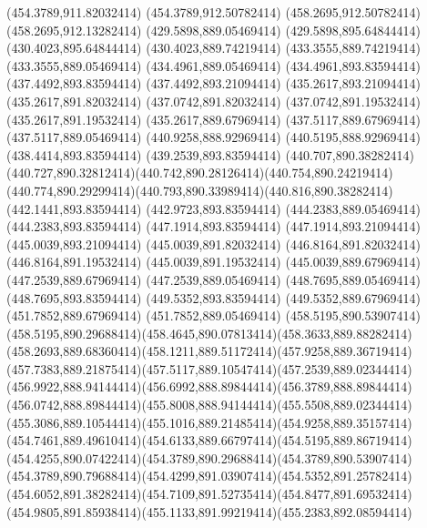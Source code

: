 {{	\lineto(454.3789,911.82032414)
	\lineto(454.3789,912.50782414)
	\lineto(458.2695,912.50782414)
	\lineto(458.2695,912.13282414)
	\closepath
	\moveto(429.5898,889.05469414)
	\lineto(429.5898,895.64844414)
	\lineto(430.4023,895.64844414)
	\lineto(430.4023,889.74219414)
	\lineto(433.3555,889.74219414)
	\lineto(433.3555,889.05469414)
	\closepath
	\moveto(434.4961,889.05469414)
	\lineto(434.4961,893.83594414)
	\lineto(437.4492,893.83594414)
	\lineto(437.4492,893.21094414)
	\lineto(435.2617,893.21094414)
	\lineto(435.2617,891.82032414)
	\lineto(437.0742,891.82032414)
	\lineto(437.0742,891.19532414)
	\lineto(435.2617,891.19532414)
	\lineto(435.2617,889.67969414)
	\lineto(437.5117,889.67969414)
	\lineto(437.5117,889.05469414)
	\closepath
	\moveto(440.9258,888.92969414)
	\lineto(440.5195,888.92969414)
	\lineto(438.4414,893.83594414)
	\lineto(439.2539,893.83594414)
	\lineto(440.707,890.38282414)
	\curveto(440.727,890.32812414)(440.742,890.28126414)(440.754,890.24219414)
	\curveto(440.774,890.29299414)(440.793,890.33989414)(440.816,890.38282414)
	\lineto(442.1441,893.83594414)
	\lineto(442.9723,893.83594414)
	\closepath
	\moveto(444.2383,889.05469414)
	\lineto(444.2383,893.83594414)
	\lineto(447.1914,893.83594414)
	\lineto(447.1914,893.21094414)
	\lineto(445.0039,893.21094414)
	\lineto(445.0039,891.82032414)
	\lineto(446.8164,891.82032414)
	\lineto(446.8164,891.19532414)
	\lineto(445.0039,891.19532414)
	\lineto(445.0039,889.67969414)
	\lineto(447.2539,889.67969414)
	\lineto(447.2539,889.05469414)
	\closepath
	\moveto(448.7695,889.05469414)
	\lineto(448.7695,893.83594414)
	\lineto(449.5352,893.83594414)
	\lineto(449.5352,889.67969414)
	\lineto(451.7852,889.67969414)
	\lineto(451.7852,889.05469414)
	\closepath
	\moveto(458.5195,890.53907414)
	\curveto(458.5195,890.29688414)(458.4645,890.07813414)(458.3633,889.88282414)
	\curveto(458.2693,889.68360414)(458.1211,889.51172414)(457.9258,889.36719414)
	\curveto(457.7383,889.21875414)(457.5117,889.10547414)(457.2539,889.02344414)
	\curveto(456.9922,888.94144414)(456.6992,888.89844414)(456.3789,888.89844414)
	\curveto(456.0742,888.89844414)(455.8008,888.94144414)(455.5508,889.02344414)
	\curveto(455.3086,889.10544414)(455.1016,889.21485414)(454.9258,889.35157414)
	\curveto(454.7461,889.49610414)(454.6133,889.66797414)(454.5195,889.86719414)
	\curveto(454.4255,890.07422414)(454.3789,890.29688414)(454.3789,890.53907414)
	\curveto(454.3789,890.79688414)(454.4299,891.03907414)(454.5352,891.25782414)
	\curveto(454.6052,891.38282414)(454.7109,891.52735414)(454.8477,891.69532414)
	\curveto(454.9805,891.85938414)(455.1133,891.99219414)(455.2383,892.08594414)
}}
